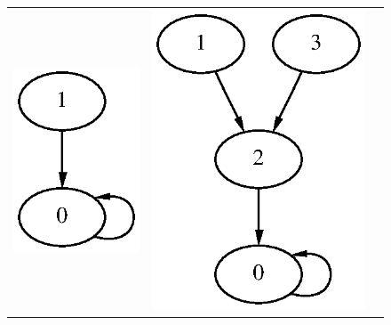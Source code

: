 \documentclass[a4paper]{report}
\begin{document}
\begin{figure}[ht]
\begin{tabular}{ccc}
\includegraphics[scale=0.75]{graph-2.eps} &
\includegraphics[scale=0.75]{graph-4.eps} &

\end{tabular}
\end{figure}
\end{document}
